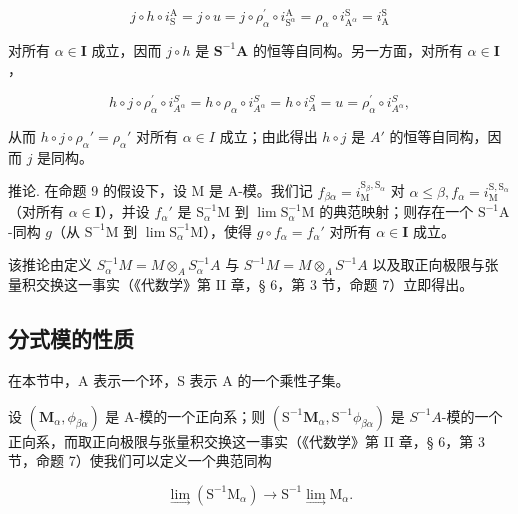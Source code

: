\[
j \circ h \circ i _ {\mathrm{S}} ^ {\mathrm{A}} = j \circ u = j \circ \rho_ {\alpha} ^ {\prime} \circ i _ {\mathrm{S} ^ {\alpha}} ^ {\mathrm{A}} = \rho_ {\alpha} \circ i _ {\mathrm{A} ^ {\alpha}} ^ {\mathrm{S}} = i _ {\mathrm{A}} ^ {\mathrm{S}}
\]

对所有 \(\alpha \in \mathbf{I}\) 成立，因而 \(j \circ h\) 是 \(\mathbf{S}^{-1}\mathbf{A}\) 的恒等自同构。另一方面，对所有 \(\alpha \in \mathbf{I}\)，

\[
h \circ j \circ \rho_ {\alpha} ^ {\prime} \circ i _ {A ^ {\alpha}} ^ {S} = h \circ \rho_ {\alpha} \circ i _ {A ^ {\alpha}} ^ {S} = h \circ i _ {A} ^ {S} = u = \rho_ {\alpha} ^ {\prime} \circ i _ {A ^ {\alpha}} ^ {S},
\]

从而 \(h \circ j \circ \rho_{\alpha}' = \rho_{\alpha}'\) 对所有 \(\alpha \in I\) 成立；由此得出 \(h \circ j\) 是 \(A'\) 的恒等自同构，因而 \(j\) 是同构。

推论. 在命题 9 的假设下，设 M 是 A-模。我们记 \(f_{\beta \alpha} = i_{\mathrm{M}}^{\mathrm{S}_{\beta},\mathrm{S}_{\alpha}}\) 对 \(\alpha \leqslant \beta, f_{\alpha} = i_{\mathrm{M}}^{\mathrm{S},\mathrm{S}_{\alpha}}\)（对所有 \(\alpha \in \mathbf{I}\)），并设 \(f_{\alpha}'\) 是 \(\mathrm{S}_{\alpha}^{-1}\mathrm{M}\) 到 \(\lim \mathrm{S}_{\alpha}^{-1}\mathrm{M}\) 的典范映射；则存在一个 \(\mathrm{S}^{-1}\mathrm{A}\)-同构 \(g\)（从 \(\mathrm{S}^{-1}\mathrm{M}\) 到 \(\lim \mathrm{S}_{\alpha}^{-1}\mathrm{M}\)），使得 \(g \circ f_{\alpha} = f_{\alpha}'\) 对所有 \(\alpha \in \mathbf{I}\) 成立。

该推论由定义 \(S_{\alpha}^{-1}M = M \otimes_{A} S_{\alpha}^{-1}A\) 与 \(S^{-1}M = M \otimes_{A} S^{-1}A\) 以及取正向极限与张量积交换这一事实（《代数学》第 II 章，§ 6，第 3 节，命题 7）立即得出。

\subsection{分式模的性质}

在本节中，A 表示一个环，S 表示 A 的一个乘性子集。

设 \((\mathbf{M}_{\alpha}, \phi_{\beta\alpha})\) 是 A-模的一个正向系；则 \((\mathrm{S}^{-1}\mathbf{M}_{\alpha}, \mathrm{S}^{-1}\phi_{\beta\alpha})\) 是 \(S^{-1}A\)-模的一个正向系，而取正向极限与张量积交换这一事实（《代数学》第 II 章，§ 6，第 3 节，命题 7）使我们可以定义一个典范同构

\[
\lim _ {\longrightarrow} \left(\mathrm{S} ^ {- 1} \mathrm{M} _ {\alpha}\right)\rightarrow \mathrm{S} ^ {- 1} \lim _ {\longrightarrow} \mathrm{M} _ {\alpha}.
\]

